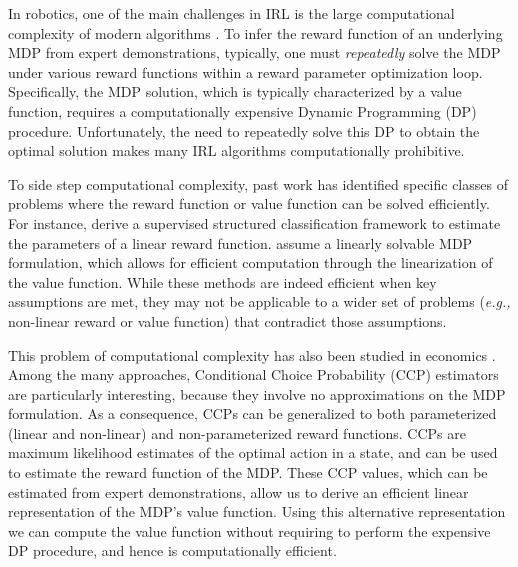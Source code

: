 \documentclass{article}
\begin{document}
In robotics, one of the main challenges in IRL is the large computational complexity of modern algorithms \cite{ziebart, Ratliff2006}. To infer the reward function of an underlying MDP from expert demonstrations, typically, one must \textit{repeatedly} solve the MDP under various reward functions within a reward parameter optimization loop. Specifically, the MDP solution, which is typically characterized by a value function, requires a computationally expensive Dynamic Programming (DP) procedure. Unfortunately, the need to repeatedly solve this DP to obtain the optimal solution makes many IRL algorithms computationally prohibitive.  

To side step computational complexity, past work \cite{klein2012inverse, dvijotham2010inverse} has identified specific classes of problems where the reward function or value function can be solved efficiently. For instance, \cite{klein2012inverse} derive a supervised structured classification framework to estimate the parameters of a linear reward function. \cite{dvijotham2010inverse} assume a linearly solvable MDP formulation, which allows for efficient computation through the linearization of the value function. While these methods are indeed efficient when key assumptions are met, they may not be applicable to a wider set of problems (\emph{e.g.,} non-linear reward or value function) that contradict those assumptions.

This problem of computational complexity has also been studied in economics \cite{hotz, su2012constrained, aguirregabiria2002swapping}. Among the many approaches, Conditional Choice Probability (CCP) estimators \cite{hotz} are particularly interesting, because they involve no approximations on the MDP formulation. As a consequence, CCPs can be generalized to both parameterized (linear and non-linear) and non-parameterized reward functions.
CCPs are maximum likelihood estimates of the optimal action in a state, and can be used to estimate the reward function of the MDP. These CCP values, which can be estimated from expert demonstrations, allow us to derive an efficient linear representation of the MDP's value function. Using this alternative representation we can compute the value function without requiring to perform the expensive DP procedure, and hence is computationally efficient.
\end{document}
